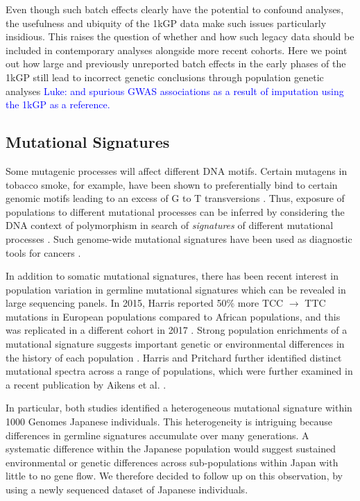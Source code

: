 \documentclass[9pt,lineno]{elife}
\newcommand{\luke}[1]{\textcolor{blue}{Luke: #1}}
\begin{document}
Even though such batch effects clearly have the potential to confound analyses, the usefulness and ubiquity of the 1kGP data make such issues particularly insidious.   
This raises the question of whether and how such legacy data should be included in contemporary analyses alongside more recent cohorts.
Here we point out how large and previously unreported batch effects in the early phases of the 1kGP still lead to incorrect genetic conclusions through population genetic analyses \luke{and spurious GWAS associations as a result of imputation using the 1kGP as a reference.}

\subsection{Mutational Signatures}

Some mutagenic processes will affect different DNA motifs. 
Certain mutagens in tobacco smoke, for example, have been shown to preferentially bind to certain genomic motifs leading to an excess of G to T transversions \citep{Pfeifer2002,Pleasance2010}. 
Thus, exposure of populations to different mutational processes can be inferred by considering the DNA context of polymorphism in search of \textit{signatures} of different mutational processes \citep{Alexandrov2013,Shiraishi2015a}. 
Such genome-wide mutational signatures have been used as diagnostic tools for cancers \citep{Alexandrov2013,Shiraishi2015a}.

In addition to somatic mutational signatures, there has been recent interest in population variation in germline mutational signatures which can be revealed in large sequencing panels. 
In 2015, Harris reported 50\% more TCC ${\rightarrow}$ TTC mutations in European populations compared to African populations, and this was replicated in a different cohort in 2017 \citep{Harris2015a, Harris2017a, Mathieson2017a}. 
Strong population enrichments of a mutational signature suggests important genetic or environmental differences in the history of each population \citep{Harris2015a, Harris2017a}. 
Harris and Pritchard further identified distinct mutational spectra across a range of populations, which were further examined in a recent publication by Aikens et al. \citep{Harris2017a,Aikens2018}.
 
 In particular, both studies  identified a heterogeneous mutational signature within 1000 Genomes Japanese individuals.
This heterogeneity is intriguing because differences in germline signatures accumulate over many generations.
A systematic difference within the Japanese population would suggest sustained environmental or genetic differences across sub-populations within Japan with little to no gene flow.
We therefore decided to follow up on this observation, by using a newly sequenced dataset of Japanese individuals. 
\end{document}

